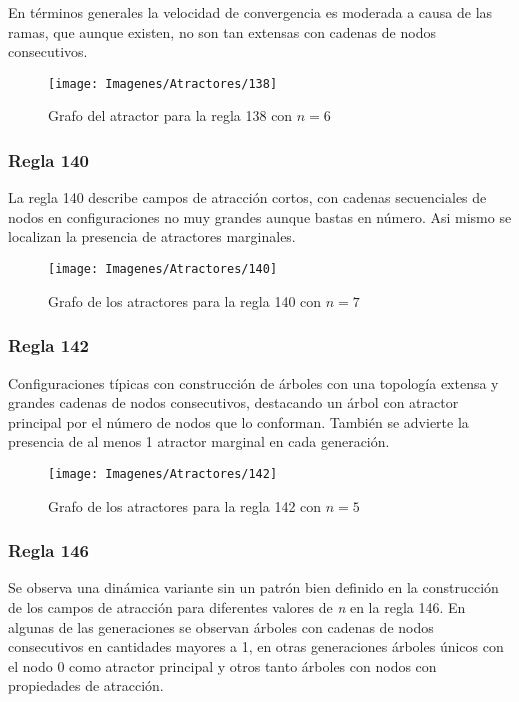 \documentclass[]{article}
\begin{document}
				\hfill\break
				\justifying
				En términos generales la velocidad de convergencia es moderada a causa de las ramas, que aunque existen, no son tan extensas con cadenas de nodos consecutivos.
				
				\hfill\break
				\hfill\break
				\begin{figure}[!h]
					\centering
					\texttt{[image: Imagenes/Atractores/138]}
					\caption{Grafo del atractor para la regla 138 con $n=6$}
					\label{Regla_138}
				\end{figure}
			
			
			\newpage
			\subsubsection{Regla 140}
				\justifying
				La regla 140 describe campos de atracción cortos, con cadenas secuenciales de nodos en configuraciones no muy grandes aunque bastas en número. Asi mismo se localizan la presencia de atractores marginales.
				
				\hfill\break
				\hfill\break
				\begin{figure}[!h]
					\centering
					\texttt{[image: Imagenes/Atractores/140]}
					\caption{Grafo de los atractores para la regla 140 con $n=7$}
					\label{Regla_140}
				\end{figure}
			
			\newpage
			\subsubsection{Regla 142}
				\justifying
				Configuraciones típicas con construcción de árboles con una topología extensa y grandes cadenas de nodos consecutivos, destacando un árbol con atractor principal por el número de nodos que lo conforman. También se advierte la presencia de al menos 1 atractor marginal en cada generación.
			
				\hfill\break
				\hfill\break
				\begin{figure}[!h]
					\centering
					\texttt{[image: Imagenes/Atractores/142]}
					\caption{Grafo de los atractores para la regla 142 con $n=5$}
					\label{Regla_142}
				\end{figure}
			
			\newpage
			\subsubsection{Regla 146}
				\justifying
				Se observa una dinámica variante sin un patrón bien definido en la construcción de los campos de atracción para diferentes valores de \textit{n} en la regla 146. En algunas de las generaciones se observan árboles con cadenas de nodos consecutivos en cantidades mayores a 1, en otras generaciones árboles únicos con el nodo 0 como atractor principal y otros tanto árboles con nodos con propiedades de atracción.
				
\end{document}
